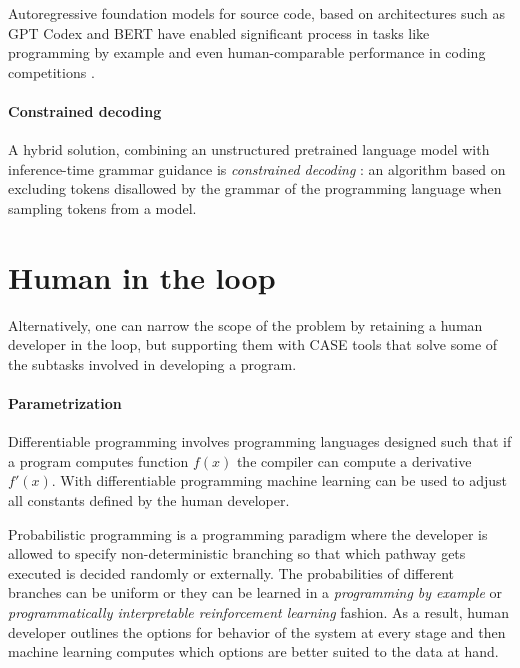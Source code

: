 Autoregressive foundation models for source code, based on architectures such as GPT Codex \cite{radfordImprovingLanguageUnderstanding,chenEvaluatingLargeLanguage2021,codegen,gpt-neo} and BERT \cite{devlinBERTPretrainingDeep2019,codebert} have enabled significant process in tasks like programming by example \cite{halbertProgrammingExample1984} and even human-comparable performance in coding competitions \cite{liCompetitionLevelCodeGeneration2022,openaiCompetitiveProgrammingLarge2025}.

\paragraph{Constrained decoding}

A hybrid solution, combining an unstructured pretrained language model with inference-time grammar guidance is \emph{constrained decoding} \cite{melcerConstrainedDecodingCode2024}: an algorithm based on excluding tokens disallowed by the grammar of the programming language when sampling tokens from a model.

\newpage
\section{Human in the loop}
\label{sec:human}

Alternatively, one can narrow the scope of the problem by retaining a human developer in the loop, but supporting them with CASE \cite{caseComputeraidedSoftwareEngineering1985} tools that solve some of the subtasks involved in developing a program.

\paragraph{Parametrization}

Differentiable programming \cite{blondelElementsDifferentiableProgramming2024} involves programming languages designed such that if a program computes function $f(x)$ the compiler can compute a derivative $f'(x)$. 
With differentiable programming machine learning can be used to adjust all constants defined by the human developer.

Probabilistic programming \cite{gordonProbabilisticProgramming2014} is a programming paradigm where the developer is allowed to specify non-deterministic branching so that which pathway gets executed is decided randomly or externally.
The probabilities of different branches can be uniform or they can be learned in a \emph{programming by example} or \emph{programmatically interpretable reinforcement learning} fashion.
As a result, human developer outlines the options for behavior of the system at every stage and then machine learning computes which options are better suited to the data at hand.


